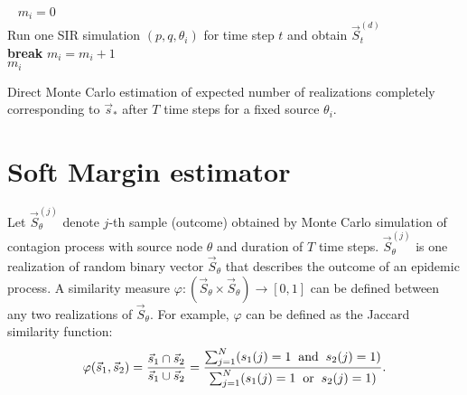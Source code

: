 \documentclass[times, utf8, diplomski]{fer}
\begin{document}
\begin{algorithm}[H]
\ 
 $m_i = 0$\\ 
  {
    {
    Run one SIR simulation $(p, q, \theta_i)$ for time step $t$ and obtain
    $\vec S_t^{(d)}$ \\
     {
   \textbf{break}
    }
   }
     {
  $m_i = m_i + 1$\\
 }
 }
  \Return $m_i$
 \label{DMC_lag}
 \caption{Direct Monte Carlo estimation of expected number of realizations completely corresponding to $\vec s_*$ after $T$ time steps  for a fixed source $\theta_i$.}
\end{algorithm}

\section{Soft Margin estimator}
Let $\vec S^{(j)}_{\theta}$ denote $j$-th sample (outcome) obtained by Monte Carlo simulation of contagion process with source node $\theta$ and duration of $T$ time steps. $\vec S^{(j)}_{\theta}$ is one realization of random binary vector $\vec S_{\theta}$ that describes the outcome of an epidemic process. A similarity measure $\varphi : (\vec S_{\theta} \times \vec S_{\theta}) \rightarrow [0, 1 ]$  can  be defined between any two  realizations of $\vec S_{\theta}$. For example,  $\varphi$ can be defined as the Jaccard similarity function:
\begin{equation}
\varphi(\vec s_1, \vec s_2) = \frac{\vec s_1 \cap \vec s_2}{\vec s_1 \cup \vec s_2 } = \frac{\sum_{j = 1}^{N} (s_1(j) = 1 \hspace{2mm} \text{and} \hspace{2mm} s_2(j) = 1) }{\sum_{j = 1}^{N} (s_1(j) = 1 \hspace{2mm} \text{or} \hspace{2mm} s_2(j) = 1) }.
\label{JaccardPHI}
\end{equation}
\end{document}
